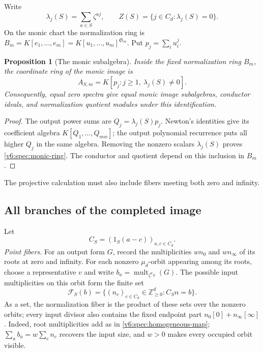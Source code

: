 \documentclass[10pt,fleqn]{article}
\numberwithin{equation}{section}
\newtheorem{proposition}[theorem]{Proposition}
\begin{document}
Write
\begin{equation}\label{v6:spec:fourier-coefficients}
 \lambda_j(S)=\sum_{a\in S}\zeta^{aj},\qquad
 Z(S)=\{j\in C_d:\lambda_j(S)=0\}.
\end{equation}
On the monic chart the normalization ring is
$B_m=K[e_1,\ldots,e_m]=K[u_1,\ldots,u_m]^{\mathfrak S_m}$.
Put $p_j=\sum_i u_i^j$.

\begin{proposition}[The monic subalgebra]\label{v6:spec:monic-algebra}
Inside the fixed normalization ring $B_m$, the coordinate ring of the monic
image is
\begin{equation}\label{v6:spec:monic-ring}
 A_{S,m}=K[p_j:j\ge1,\ \lambda_j(S)\ne0].
\end{equation}
Consequently, equal zero spectra give equal monic image subalgebras, conductor
ideals, and normalization quotient modules under this identification.
\end{proposition}

\begin{proof}
The output power sums are $Q_j=\lambda_j(S)p_j$.  Newton's identities
give its coefficient algebra $K[Q_1,\ldots,Q_{mw}]$; the output
polynomial recurrence puts all higher $Q_j$ in the same algebra.
Removing the nonzero scalars $\lambda_j(S)$ proves
\eqref{v6:spec:monic-ring}.  The conductor and quotient depend on
this inclusion in $B_m$.
\end{proof}

The projective calculation must also include fibers meeting both zero
and infinity.

\subsection{All branches of the completed image}

Let
\begin{equation}\label{v6:spec:circulant}
 C_S=(1_S(a-c))_{a,c\in C_d}.
\end{equation}
\emph{Point fibers.}
For an output form $G$, record the multiplicities $wn_0$ and $wn_\infty$
of its roots at zero and infinity.  For each nonzero $\mu_d$-orbit appearing
among its roots, choose a representative $v$ and write
$b_a=\operatorname{mult}_{\zeta^a v}(G)$.  The possible input multiplicities
on this orbit form the finite set
\begin{equation}\label{v6:spec:feasible-fiber}
 \mathcal F_S(b)=\{(n_c)_{c\in C_d}\in\mathbb Z_{\ge0}^d:C_Sn=b\}.
\end{equation}
As a set, the normalization fiber is the product of these
sets over the nonzero orbits; every input divisor also contains
the fixed endpoint part $n_0[0]+n_\infty[\infty]$.
Indeed, root multiplicities add as in
\eqref{v6:spec:homogeneous-map}; $\sum_a b_a=w\sum_c n_c$ recovers
the input size, and $w>0$ makes every occupied orbit visible.
\end{document}
